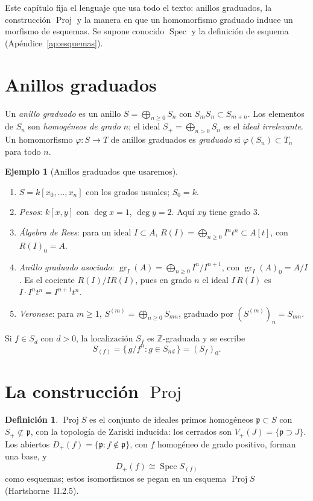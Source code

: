 \documentclass[11pt,a4paper,oneside]{book}
\newcommand{\Spec}{\operatorname{Spec}}
\newcommand{\Proj}{\operatorname{Proj}}
\newcommand{\gr}{\operatorname{gr}}
\newcommand{\ZZ}{\mathbb{Z}}
\theoremstyle{plain}
\theoremstyle{definition}
\newtheorem{definicion}[teorema]{Definición}
\newtheorem{ejemplo}[teorema]{Ejemplo}
\theoremstyle{remark}
\begin{document}
Este capítulo fija el lenguaje que usa todo el texto: anillos graduados, la construcción $\Proj$ y la manera en que un homomorfismo graduado induce un morfismo de esquemas. Se supone conocido $\Spec$ y la definición de esquema (Apéndice~\ref{ap:esquemas}).

\section{Anillos graduados}

Un \emph{anillo graduado} es un anillo $S=\bigoplus_{n\ge0}S_n$ con $S_mS_n\subset S_{m+n}$. Los elementos de $S_n$ son \emph{homogéneos de grado $n$}; el ideal $S_+=\bigoplus_{n>0}S_n$ es el \emph{ideal irrelevante}. Un homomorfismo $\varphi:S\to T$ de anillos graduados es \emph{graduado} si $\varphi(S_n)\subset T_n$ para todo $n$.

\begin{ejemplo}[Anillos graduados que usaremos]\label{ej:graduados}
\begin{enumerate}[label=(\alph*)]
\item $S=k[x_0,\dots,x_n]$ con los grados usuales; $S_0=k$.
\item \emph{Pesos}: $k[x,y]$ con $\deg x=1$, $\deg y=2$. Aquí $xy$ tiene grado $3$.
\item \emph{Álgebra de Rees}: para un ideal $I\subset A$, $R(I)=\bigoplus_{n\ge0}I^nt^n\subset A[t]$, con $R(I)_0=A$.
\item \emph{Anillo graduado asociado}: $\gr_I(A)=\bigoplus_{n\ge0}I^n/I^{n+1}$, con $\gr_I(A)_0=A/I$. Es el cociente $R(I)/IR(I)$, pues en grado $n$ el ideal $I\,R(I)$ es $I\cdot I^nt^n=I^{n+1}t^n$.
\item \emph{Veronese}: para $m\ge1$, $S^{(m)}=\bigoplus_{n\ge0}S_{mn}$, graduado por $(S^{(m)})_n=S_{mn}$.
\end{enumerate}
\end{ejemplo}

Si $f\in S_d$ con $d>0$, la localización $S_f$ es $\ZZ$-graduada y se escribe
\[
S_{(f)}=\{\,g/f^n : g\in S_{nd}\,\}=(S_f)_0 .
\]

\section{La construcción $\Proj$}

\begin{definicion}
$\Proj S$ es el conjunto de ideales primos homogéneos $\mathfrak p\subset S$ con $S_+\not\subset\mathfrak p$, con la topología de Zariski inducida: los cerrados son $V_+(J)=\{\mathfrak p\supset J\}$. Los abiertos $D_+(f)=\{\mathfrak p: f\notin\mathfrak p\}$, con $f$ homogéneo de grado positivo, forman una base, y
\[
D_+(f)\cong\Spec S_{(f)}
\]
como esquemas; estos isomorfismos se pegan en un esquema $\Proj S$ (Hartshorne~II.2.5).
\end{definicion}
\end{document}
